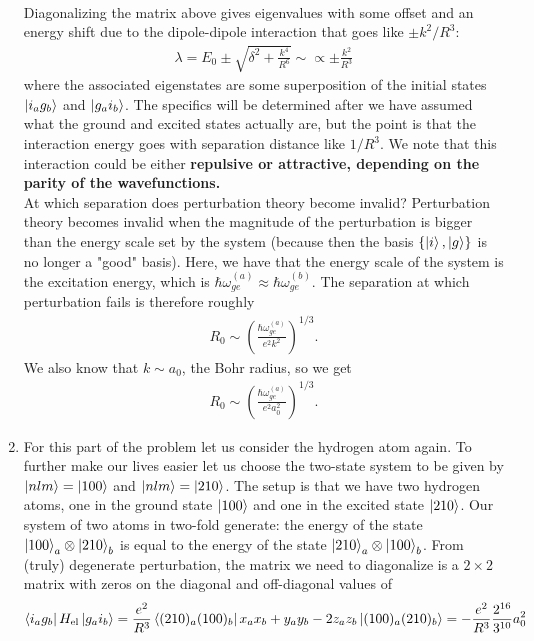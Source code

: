 \documentclass{article}
\theoremstyle{definition}
\newcommand{\f}[2]{\frac{#1}{#2}}
\newcommand{\lp}{\left(}
\newcommand{\rp}{\right)}
\begin{document}
\begin{enumerate}[label=(\alph*)]
\begin{align*}
\end{align*}
Diagonalizing the matrix above gives eigenvalues with some offset and an energy shift due to the dipole-dipole interaction that goes like $\pm k^2/R^3$: 
\begin{align*}
\lambda = E_0 \pm \sqrt{\delta^2 + \f{k^4}{R^6}} \sim \propto \pm \f{k^2}{R^3}
\end{align*}
where the associated eigenstates are some superposition of the initial states $\ket{i_a g_b}$ and $\ket{g_a i_b}$. The specifics will be determined after we have assumed what the ground and excited states actually are, but the point is that the interaction energy goes with separation distance like $1/R^3$. We note that this interaction could be either \textbf{repulsive or attractive, depending on the parity of the wavefunctions.} \\

At which separation does perturbation theory become invalid? Perturbation theory becomes invalid when the magnitude of the perturbation is bigger than the energy scale set by the system (because then the basis $\{\ket{i}, \ket{g} \}$ is no longer a "good" basis). Here, we have that the energy scale of the system is the excitation energy, which is $\hbar \omega_{ge}^{(a)} \approx \hbar \omega_{ge}^{(b)}$. The separation at which perturbation fails is therefore roughly
\begin{align*}
R_0 \sim \lp \f{\hbar \omega_{ge}^{(a)}}{ e^2 k^2} \rp^{1/3}. 
\end{align*}
We also know that $k\sim a_0$, the Bohr radius, so we get
\begin{align*}
R_0 \sim \lp \f{\hbar \omega_{ge}^{(a)}}{ e^2 a_0^2} \rp^{1/3}.
\end{align*}


\item For this part of the problem let us consider the hydrogen atom again. To further make our lives easier let us choose the two-state system to be given by $\ket{nlm} = \ket{100}$ and $\ket{nlm} = \ket{210}$. The setup is that we have two hydrogen atoms, one in the ground state $\ket{100}$ and one in the excited state $\ket{210}$. Our system of two atoms in two-fold generate: the energy of the state $\ket{100}_a \otimes \ket{210}_b$ is equal to the energy of the state $\ket{210}_a \otimes \ket{100}_b$. From (truly) degenerate perturbation, the matrix we need to diagonalize is a $2\times 2$ matrix with zeros on the diagonal and off-diagonal values of
\begin{align*}
\bra{i_a g_b} H_\text{el} \ket{g_a i_b} = \f{e^2}{R^3} \bra{(210)_a (100)_b} x_a x_b + y_a y_b - 2 z_a z_b \ket{(100)_a (210)_b} = -\f{e^2}{R^3} \f{2^{16}}{3^{10}} a_0^2 
\end{align*}


\end{enumerate}
\end{document}
